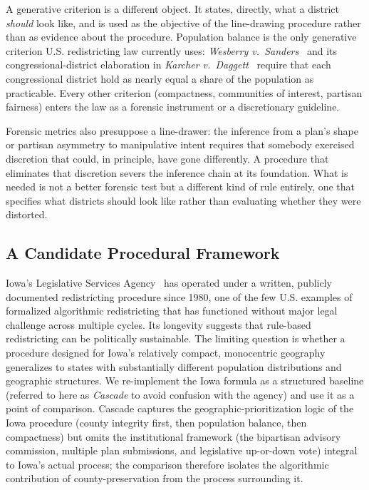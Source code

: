 A generative criterion is a different object. It states, directly,
what a district \emph{should} look like, and is used as the
objective of the line-drawing procedure rather than as evidence
about the procedure. Population balance is the only generative
criterion U.S. redistricting law currently uses:
\textit{Wesberry v.~Sanders}~\cite{wesberry1964} and its
congressional-district elaboration in \textit{Karcher
v.~Daggett}~\cite{karcher1983} require that each congressional
district hold as nearly equal a share of the population as
practicable. Every other criterion (compactness,
communities of interest, partisan fairness) enters the law as a
forensic instrument or a discretionary guideline.

Forensic metrics also presuppose a line-drawer: the inference from a
plan's shape or partisan asymmetry to manipulative intent requires
that somebody exercised discretion that could, in principle, have
gone differently. A procedure that eliminates that discretion severs
the inference chain at its foundation. What is needed is not a better
forensic test but a different kind of rule entirely, one that
specifies what districts should look like rather than evaluating
whether they were distorted.

\subsection{A Candidate Procedural Framework}
\label{sec:intro-contribution}

Iowa's Legislative Services Agency~\cite{iowalsa} has operated under
a written, publicly documented redistricting procedure since 1980,
one of the few U.S. examples of formalized algorithmic redistricting
that has functioned without major legal challenge across multiple
cycles. Its longevity suggests that rule-based redistricting can be
politically sustainable. The limiting question is whether a procedure
designed for Iowa's relatively compact, monocentric geography
generalizes to states with substantially different population
distributions and geographic structures. We re-implement the Iowa
formula as a structured baseline (referred to here as \emph{Cascade}
to avoid confusion with the agency) and use it as a point of
comparison. Cascade captures the geographic-prioritization logic of
the Iowa procedure (county integrity first, then population balance,
then compactness) but omits the institutional framework (the
bipartisan advisory commission, multiple plan submissions, and
legislative up-or-down vote) integral to Iowa's actual process; the
comparison therefore isolates the algorithmic contribution of
county-preservation from the process surrounding it.

